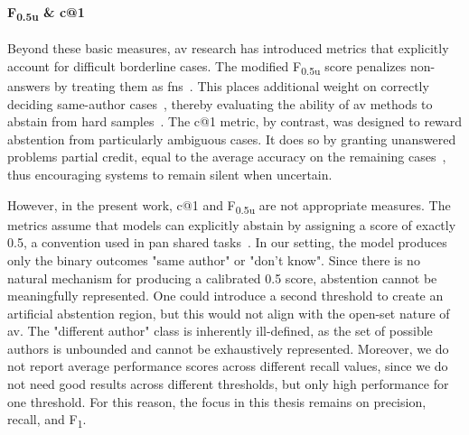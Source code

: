 \paragraph{F\textsubscript{0.5u} \& c@1}
Beyond these basic measures, \ac{av} research has introduced metrics that explicitly account for difficult borderline cases. 
The modified F\textsubscript{0.5u} score penalizes non-answers by treating them as \acp{fn}~\citep{bevendorff_overview_2024}. 
This places additional weight on correctly deciding same-author cases~\citep{weerasinghe_feature_vector_difference_2021}, thereby evaluating the ability of \ac{av} methods to abstain from hard samples~\citep{tyo_state_2022}. 
The c@1 metric, by contrast, was designed to reward abstention from particularly ambiguous cases. 
It does so by granting unanswered problems partial credit, equal to the average accuracy on the remaining cases~\citep{bevendorff_overview_2024}, thus encouraging systems to remain silent when uncertain.

However, in the present work, c@1 and F\textsubscript{0.5u} are not appropriate measures. 
The metrics assume that models can explicitly abstain by assigning a score of exactly 0.5, a convention used in \ac{pan} shared tasks~\citep{tyo_state_2022,bevendorff_overview_2024,kocher_unine_2015}. 
In our setting, the model produces only the binary outcomes "same author" or "don't know". 
Since there is no natural mechanism for producing a calibrated 0.5 score, abstention cannot be meaningfully represented. 
One could introduce a second threshold to create an artificial abstention region, but this would not align with the open-set nature of \ac{av}. 
The "different author" class is inherently ill-defined, as the set of possible authors is unbounded and cannot be exhaustively represented. 
Moreover, we do not report average performance scores across different recall values, since we do not need good results across different thresholds, but only high performance for one threshold.
For this reason, the focus in this thesis remains on precision, recall, and F\textsubscript{1}. 
